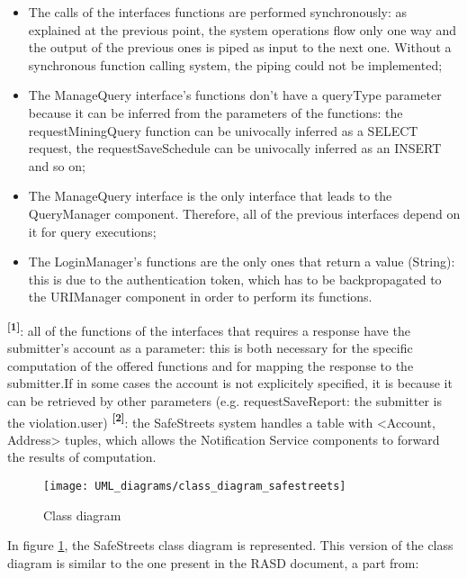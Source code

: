 \begin{itemize}
    \item The calls of the interfaces functions are performed synchronously: as explained at the previous point, the system operations flow only one way and the output of the previous ones is piped as input to the next one. Without a synchronous function calling system, the piping could not be implemented;
    \item The ManageQuery interface's functions don't have a queryType parameter because it can be inferred from the parameters of the functions: the requestMiningQuery function can be univocally inferred as a SELECT request, the requestSaveSchedule can be univocally inferred as an INSERT and so on;
    \item The ManageQuery interface is the only interface that leads to the QueryManager component. Therefore, all of the previous interfaces depend on it for query executions;
    \item The LoginManager's functions are the only ones that return a value (String): this is due to the authentication token, which has to be backpropagated to the URIManager component in order to perform its functions.
\end{itemize}
\textbf{\textsuperscript{[1]}}: all of the functions of the interfaces that requires a response have the submitter's account as a parameter: this is both necessary for the specific computation of the offered functions and for mapping the response to the submitter.If in some cases the account is not explicitely specified, it is because it can be retrieved by other parameters (e.g. requestSaveReport: the submitter is the violation.user)\newline
\textbf{\textsuperscript{[2]}}: the SafeStreets system handles a table with <Account, Address> tuples, which allows the Notification Service components to forward the results of computation.
\begin{figure}[H]
    \centering
    \texttt{[image: UML\_diagrams/class\_diagram\_safestreets]}
    \caption{Class diagram}
    \label{fig:class_diagram}
\end{figure}
In figure \ref{fig:class_diagram}, the SafeStreets class diagram is represented. This version of the class diagram is similar to the one present in the RASD document, a part from:
